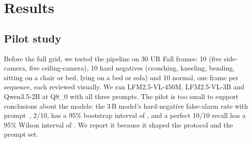 \section{Results}
\label{sec:results}

\subsection{Pilot study}
\label{sec:pilot}
Before the full grid, we tested the pipeline on 30 UR Fall frames: 10 \pd{} (five side-camera, five ceiling-camera), 10 hard negatives (crouching, kneeling, bending, sitting on a chair or bed, lying on a bed or sofa) and 10 normal, one frame per sequence, each reviewed visually. We ran LFM2.5-VL-450M, LFM2.5-VL-3B and Qwen3.5-2B at Q8\_0 with all three prompts. The pilot is too small to support conclusions about the models: the 3\,B model's hard-negative false-alarm rate with prompt~\promptA{}, 2/10, has a 95\% bootstrap interval of \PilotLargeAFaHardCI, and a perfect 10/10 recall has a 95\% Wilson interval of \PilotRecallWilsonCI. We report it because it shaped the protocol and the prompt set.

\begin{table}[t]
\centering
\caption{Pilot study on 30 UR Fall frames (10 per class), default operating point, Q8\_0. FA = false alarms. AUROC is computed from $p_\text{yes}$. Too small for model comparisons; reported because it shaped the protocol.}
\label{tab:pilot}
\footnotesize
\setlength{\tabcolsep}{3.5pt}

\end{table}

